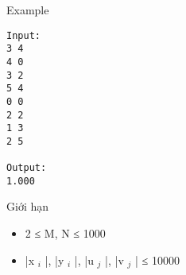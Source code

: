 Example
\begin{verbatim}
Input:
3 4
4 0
3 2
5 4
0 0
2 2
1 3
2 5

Output:
1.000
\end{verbatim}
Giới hạn
\begin{itemize}
	\item     2 ≤ M, N ≤ 1000   
	\item     |x    $_     i    $    |, |y    $_     i    $    |, |u    $_     j    $    |, |v    $_     j    $    | ≤ 10000   
\end{itemize}